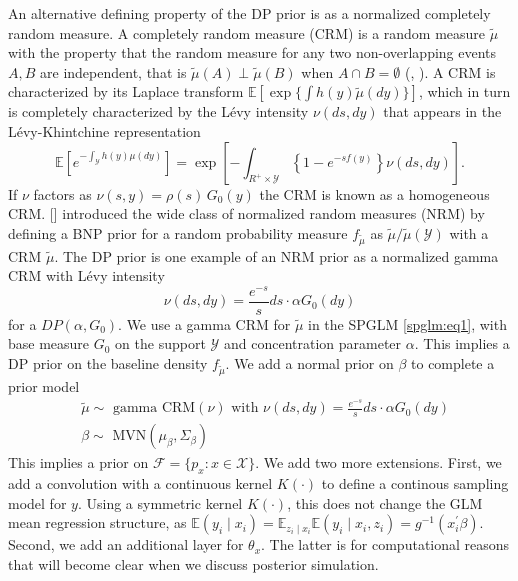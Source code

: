 \documentclass{article}[12pt]
\newcommand{\YY}{\mathcal{Y}}
\newcommand{\citeaa}[1]{\citeauthor{#1}, \href{cite.#1}{\textcolor{blue}{\citeyear{#1}}}}     %
\newcommand{\citeab}[1]{\citeauthor{#1} [\href{cite.#1}{\textcolor{blue}{\citeyear{#1}}}]}  %
\renewcommand{\th}{\theta}
\newcommand{\tmu}{\widetilde{\mu}}
\newcommand{\scf}{\mathcal{F}}
\newcommand{\sx}{\mathcal{X}}
\newcommand{\sy}{\mathcal{Y}}
\newcommand{\E}{\mathbb{E}}
\renewcommand{\scf}{\mathcal{F}}
\renewcommand{\sx}{\mathcal{X}}
\renewcommand{\sy}{\mathcal{Y}}
\begin{document}
An alternative  defining property of the DP prior is as a normalized completely random measure. A completely random measure (CRM) is a random measure $\tmu$ with the property that the random measure for any two non-overlapping events $A,B$ are independent, that is $\tmu(A) \perp \tmu(B)$ when $A \cap B = \emptyset$ (\citeaa{kingman1967completely}).
A CRM is characterized by its Laplace transform $\E[\exp\{ \int h(y) \tmu(dy) \}]$, which in turn is completely characterized by the L\'evy intensity $\nu(ds, dy)$ that appears in the L\'evy-Khintchine representation
\begin{equation}
\E\left[e^{-\int_\sy h(y) \mu(dy)}\right] = \exp \left[- \int_{R^+
    \times \sy} \left\{1 - e^{-sf(y)}\right\}\nu(ds, dy) \right].
\label{eq:LK}
\end{equation}
If $\nu$ factors as $\nu(s,y)= \rho(s)\, G_0(y)$ the CRM is known as
a homogeneous CRM. \citeab{regazzini2003distributional} introduced the wide class of normalized random measures (NRM) by defining a BNP prior for a random probability measure $f_{\tmu}$ as $\tmu/\tmu(\sy)$ with 
a CRM $\tmu$.
The DP prior is one example of an NRM prior as a normalized gamma CRM
with L\'evy intensity
\begin{equation}
\nu(ds, dy)= \frac{e^{-s}}{s} ds \cdot \alpha G_0(dy)
\label{eq:ga}
\end{equation}
for a $DP(\alpha,G_0)$. We use a gamma CRM for $\tmu$ in the SPGLM \eqref{spglm:eq1}, with base measure $G_0$ on the
support $\YY$ and concentration parameter $\alpha$. This
implies a DP prior on the baseline density $f_{\tmu}$. We add a normal prior on $\beta$ to complete a prior model 
\begin{align} 
\label{priors}
  &\tmu \sim \text{ gamma CRM}(\nu)
    \mbox{ with }
    \nu(ds, dy) = \frac{e^{-s}}{s} ds \cdot \alpha G_0(dy) \nonumber \\ 
    & \beta \sim \text{ MVN}(\mu_\beta, \Sigma_\beta) 
\end{align}
This implies a prior on $\scf = \{p_x: x \in \sx\}$. We add two more
extensions.
First, we add a convolution with a continuous kernel $K(\cdot)$ to
define a continous sampling model for $y$.  Using a symmetric
kernel $K(\cdot)$, this
does not change the GLM mean regression structure, as $\E(y_i \mid
x_i) = \E_{z_i \mid x_i}  \E(y_i \mid x_i, z_i) = g^{-1}(x^\prime_i
\beta)$. 
Second, we add an additional layer for $\th_x$. The latter is for
computational reasons that will become clear when we discuss posterior
simulation.
\end{document}

